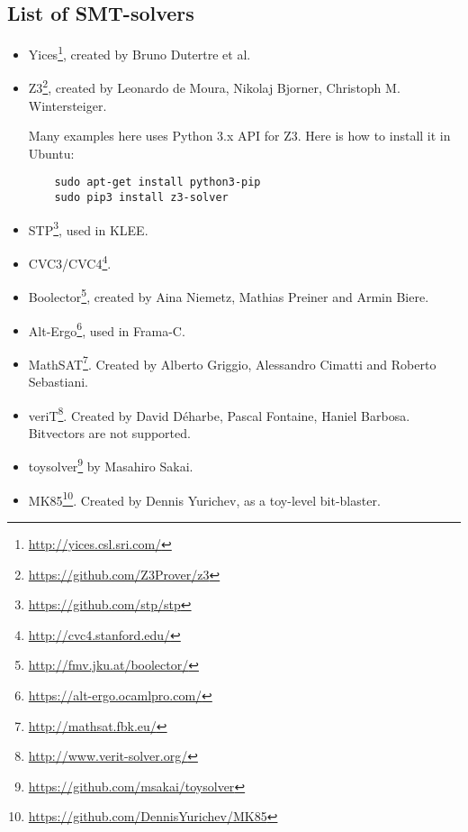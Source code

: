\subsection{List of SMT-solvers}

\begin{itemize}

\item Yices\footnote{\url{http://yices.csl.sri.com/}}, created by Bruno Dutertre et al.

\item Z3\footnote{\url{https://github.com/Z3Prover/z3}},
created by Leonardo de Moura, Nikolaj Bjorner, Christoph M. Wintersteiger.

	Many examples here uses Python 3.x API for Z3.
	Here is how to install it in Ubuntu:

	\begin{lstlisting}
	sudo apt-get install python3-pip
	sudo pip3 install z3-solver
	\end{lstlisting}

\item STP\footnote{\url{https://github.com/stp/stp}}, used in KLEE.

\item CVC3/CVC4\footnote{\url{http://cvc4.stanford.edu/}}.

\item Boolector\footnote{\url{http://fmv.jku.at/boolector/}}, created by Aina Niemetz, Mathias Preiner and Armin Biere.

\item Alt-Ergo\footnote{\url{https://alt-ergo.ocamlpro.com/}}, used in Frama-C.

\item MathSAT\footnote{\url{http://mathsat.fbk.eu/}}. Created by Alberto Griggio, Alessandro Cimatti and Roberto Sebastiani.

\item veriT\footnote{\url{http://www.verit-solver.org/}}.
Created by David Déharbe, Pascal Fontaine, Haniel Barbosa.
Bitvectors are not supported.

\item toysolver\footnote{\url{https://github.com/msakai/toysolver}} by Masahiro Sakai.

\item MK85\footnote{\url{https://github.com/DennisYurichev/MK85}}. Created by Dennis Yurichev, as a toy-level bit-blaster.

\end{itemize}

